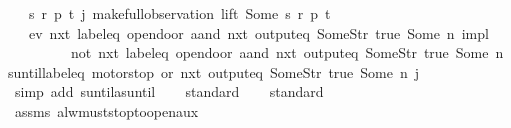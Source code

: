 \begin{isabellebody}
\ \ \ {\isachardoublequoteopen}{\isasymexists}s\ r\ p\ t{\isachardot}\ j{\isacharequal}\ make{\isacharunderscore}full{\isacharunderscore}observation\ lift\ {\isacharparenleft}Some\ s{\isacharparenright}\ r\ p\ t{\isachardoublequoteclose}\isanewline
\ \ \ {\isachardoublequoteopen}{\isacharparenleft}{\isacharparenleft}ev\ {\isacharparenleft}nxt\ {\isacharparenleft}{\isacharparenleft}label{\isacharunderscore}eq\ {\isacharprime}{\isacharprime}opendoor{\isacharprime}{\isacharprime}{\isacharparenright}\ aand\ {\isacharparenleft}nxt\ {\isacharparenleft}output{\isacharunderscore}eq\ {\isacharbrackleft}Some{\isacharparenleft}Str\ {\isacharprime}{\isacharprime}true{\isacharprime}{\isacharprime}{\isacharparenright}{\isacharcomma}\ Some\ n{\isacharbrackright}{\isacharparenright}{\isacharparenright}{\isacharparenright}{\isacharparenright}{\isacharparenright}\ impl\isanewline
\ \ \ \ \ \ \ \ \ {\isacharparenleft}{\isacharparenleft}not\ {\isacharparenleft}nxt\ {\isacharparenleft}label{\isacharunderscore}eq\ {\isacharprime}{\isacharprime}opendoor{\isacharprime}{\isacharprime}\ aand\ {\isacharparenleft}nxt\ {\isacharparenleft}output{\isacharunderscore}eq\ {\isacharbrackleft}Some{\isacharparenleft}Str\ {\isacharprime}{\isacharprime}true{\isacharprime}{\isacharprime}{\isacharparenright}{\isacharcomma}\ Some\ n{\isacharbrackright}{\isacharparenright}{\isacharparenright}{\isacharparenright}{\isacharparenright}{\isacharparenright}\ suntil{\isacharparenleft}{\isacharparenleft}{\isacharparenleft}label{\isacharunderscore}eq\ {\isacharprime}{\isacharprime}motorstop{\isacharprime}{\isacharprime}{\isacharparenright}\ or\ {\isacharparenleft}nxt\ {\isacharparenleft}output{\isacharunderscore}eq\ {\isacharbrackleft}Some{\isacharparenleft}Str\ {\isacharprime}{\isacharprime}true{\isacharprime}{\isacharprime}{\isacharparenright}{\isacharcomma}\ Some\ n{\isacharbrackright}{\isacharparenright}{\isacharparenright}{\isacharparenright}{\isacharparenright}{\isacharparenright}{\isacharparenright}\ j{\isachardoublequoteclose}\isanewline
%
\isadelimproof
\ \ %
\endisadelimproof
%
\isatagproof
{}\isamarkupfalse%
\ {\isacharparenleft}simp\ add{\isacharcolon}\ suntil{\isacharunderscore}as{\isacharunderscore}until{\isacharparenright}\isanewline
\ \ \isamarkupfalse%
\ standard\isanewline
\ \ \isamarkupfalse%
\ standard\isanewline
\ \ \isamarkupfalse%
\ assms\ alw{\isacharunderscore}must{\isacharunderscore}stop{\isacharunderscore}to{\isacharunderscore}open{\isacharunderscore}aux\ \isamarkupfalse%

\end{isabellebody}
